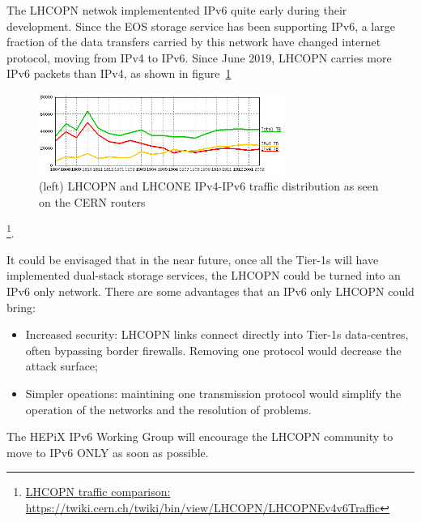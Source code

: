 
The LHCOPN netwok implementented IPv6 quite early during their development. 
Since the EOS storage service has been supporting IPv6, a large fraction of the data transfers carried by this network have changed internet  protocol, moving from IPv4 to IPv6. Since June 2019, LHCOPN carries more IPv6 packets than IPv4, as shown in figure~\ref{fig:lhcopne-traffic}

\begin{figure}[h]
\centering
\includegraphics[width=8cm]{lhcopne-traffic.png}
\caption{(left) LHCOPN and LHCONE IPv4-IPv6 traffic distribution as seen on the CERN routers\cite{RefLHCOPNEv4v6}  }
\label{fig:lhcopne-traffic}
\end{figure}

\footnote{\href{https://twiki.cern.ch/twiki/bin/view/LHCOPN/LHCOPNEv4v6Traffic}{LHCOPN traffic comparison: https://twiki.cern.ch/twiki/bin/view/LHCOPN/LHCOPNEv4v6Traffic}}. 

It could be envisaged that in the near future, once all the Tier-1s will have implemented dual-stack storage services, the LHCOPN could be turned into an IPv6 only network. There are some advantages that an IPv6 only LHCOPN could bring:
\begin{itemize}
  \item Increased security: LHCOPN links connect directly into Tier-1s data-centres, often bypassing border firewalls. Removing one protocol would decrease the attack surface;
  \item Simpler opeations: maintining one transmission protocol would simplify the operation of the networks and the resolution of problems.
\end{itemize}

The HEPiX IPv6 Working Group will encourage the LHCOPN community to move to IPv6 ONLY as soon as possible.




